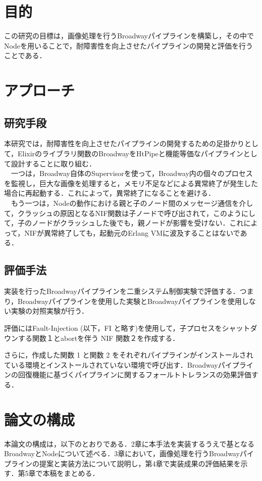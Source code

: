 \documentclass[a4paper]{jreport}	%
\begin{document}
\section{目的}
この研究の目標は，画像処理を行うBroadwayパイプラインを構築し，その中でNodeを用いることで，耐障害性を向上させたパイプラインの開発と評価を行うことである．
\section{アプローチ}
\subsection{研究手段}
本研究では，耐障害性を向上させたパイプラインの開発するための足掛かりとして，Elixirのライブラリ関数のBroadwayをHtPipeと機能等価なパイプラインとして設計することに取り組む．
\\　一つは，Broadway自体のSupervisorを使って，Broadway内の個々のプロセスを監視し，巨大な画像を処理すると，メモリ不足などによる異常終了が発生した場合に再起動する．これによって，異常終了になることを避ける．
\\　もう一つは，Nodeの動作における親と子のノード間のメッセージ通信を介して，クラッシュの原因となるNIF関数は子ノードで呼び出されて，このようにして，子のノードがクラッシュした後でも，親ノードが影響を受けない．これによって，NIFが異常終了しても，起動元のErlang VMに波及することはないである．
\subsection{評価手法}
実装を行ったBroadwayパイプラインを二重システム制御実験で評価する．つまり，Broadwayパイプラインを使用した実験とBroadwayパイプラインを使用しない実験の対照実験が行う．

評価にはFault-Injection (以下，FI と略す)を使用して，子プロセスをシャットダウンする関数１とabortを伴う NIF 関数２を作成する．

さらに，作成した関数 1 と関数 2 をそれぞれパイプラインがインストールされている環境とインストールされていない環境で呼び出す．Broadwayパイプラインの回復機能に基づくパイプラインに関するフォールトトレランスの効果評価する．

\section{論文の構成}
本論文の構成は，以下のとおりである．2章に本手法を実装するうえで基となるBroadwayとNodeについて述べる．3章において，画像処理を行うBroadwayパイプラインの提案と実装方法について説明し，第4章で実装成果の評価結果を示す．第5章で本稿をまとめる．
\end{document}
